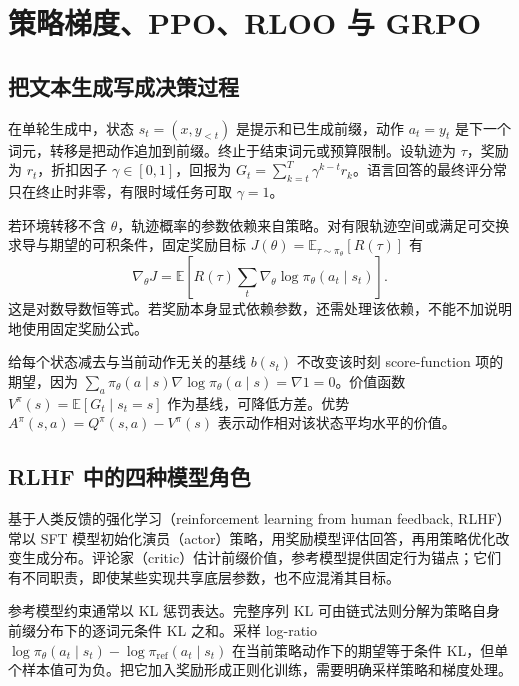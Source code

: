 \setcounter{chapter}{11} %
\chapter{策略梯度、PPO、RLOO 与 GRPO}
\label{ch:policy}

\section{把文本生成写成决策过程}

在单轮生成中，状态 $s_t=(x,y_{<t})$ 是提示和已生成前缀，动作 $a_t=y_t$ 是下一个词元，转移是把动作追加到前缀。终止于结束词元或预算限制。设轨迹为 $\tau$，奖励为 $r_t$，折扣因子 $\gamma\in[0,1]$，回报为 $G_t=\sum_{k=t}^{T}\gamma^{k-t}r_k$。语言回答的最终评分常只在终止时非零，有限时域任务可取 $\gamma=1$。

若环境转移不含 $\theta$，轨迹概率的参数依赖来自策略。对有限轨迹空间或满足可交换求导与期望的可积条件，固定奖励目标 $J(\theta)=\mathbb E_{\tau\sim\pi_\theta}[R(\tau)]$ 有
\begin{equation}
\nabla_\theta J=\mathbb E\left[R(\tau)\sum_t\nabla_\theta\log\pi_\theta(a_t\mid s_t)\right].
\label{eq:policy-gradient}
\end{equation}
这是对数导数恒等式。若奖励本身显式依赖参数，还需处理该依赖，不能不加说明地使用固定奖励公式。

给每个状态减去与当前动作无关的基线 $b(s_t)$ 不改变该时刻 score-function 项的期望，因为 $\sum_a\pi_\theta(a\mid s)\nabla\log\pi_\theta(a\mid s)=\nabla1=0$。价值函数 $V^\pi(s)=\mathbb E[G_t\mid s_t=s]$ 作为基线，可降低方差。优势 $A^\pi(s,a)=Q^\pi(s,a)-V^\pi(s)$ 表示动作相对该状态平均水平的价值。

\section{RLHF 中的四种模型角色}

基于人类反馈的强化学习（reinforcement learning from human feedback, RLHF）常以 SFT 模型初始化演员（actor）策略，用奖励模型评估回答，再用策略优化改变生成分布。评论家（critic）估计前缀价值，参考模型提供固定行为锚点；它们有不同职责，即使某些实现共享底层参数，也不应混淆其目标。

参考模型约束通常以 KL 惩罚表达。完整序列 KL 可由链式法则分解为策略自身前缀分布下的逐词元条件 KL 之和。采样 log-ratio $\log\pi_\theta(a_t\mid s_t)-\log\pi_{\mathrm{ref}}(a_t\mid s_t)$ 在当前策略动作下的期望等于条件 KL，但单个样本值可为负。把它加入奖励形成正则化训练，需要明确采样策略和梯度处理。

